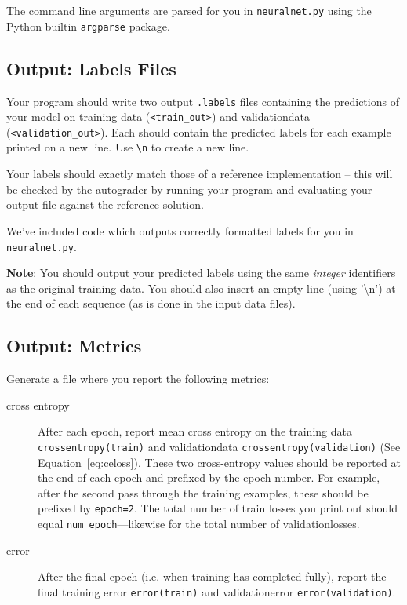 \documentclass[11pt,addpoints,answers]{exam}
\begin{document}
The command line arguments are parsed for you in \texttt{neuralnet.py} using the Python builtin \texttt{argparse} package.

\subsection{Output: Labels Files} \label{output}
Your program should write two output \texttt{.labels} files containing the predictions of your model on training data (\texttt{<train\_out>}) and validation\thinspace data (\texttt{<validation\_out>}). Each should contain the predicted labels for each example printed on a new line. Use \lstinline{\n} to create a new line. 

Your labels should exactly match those of a reference implementation -- this will be checked by the autograder by running your program and evaluating your output file against the reference solution.

We've included code which outputs correctly formatted labels for you in \texttt{neuralnet.py}.

\textbf{Note}: You should output your predicted labels using the same \emph{integer} identifiers as the original training data. You should also insert an empty line (using ’\textbackslash n’) at the end of each sequence (as is done in the input data files).

\subsection{Output: Metrics} \label{metrics}
Generate a file where you report the following metrics: 

\begin{description}
\item[cross entropy] After each epoch, report mean cross entropy on the training data \lstinline{crossentropy(train)} and validation\thinspace data \texttt{crossentropy(validation)} (See Equation~\ref{eq:celoss}). These two cross-entropy values should be reported at the end of each epoch and prefixed by the epoch number. For example, after the second pass through the training examples, these should be prefixed by \lstinline{epoch=2}. The total number of train losses you print out should equal \texttt{num\_epoch}---likewise for the total number of validation\thinspace losses.
\item[error] After the final epoch (i.e. when training has completed fully), report the final training error \lstinline{error(train)} and validation\thinspace error \texttt{error(validation)}. 
\end{description}
\end{document}
